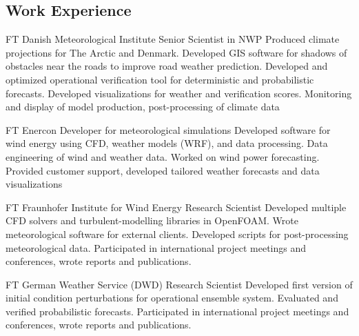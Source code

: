 \documentclass[10pt]{article} %
\begin{document}
\begin{paracol}{2}
\section{Work Experience}





{FT} %
{Danish Meteorological Institute} %
{Senior Scientist in NWP} %
{Produced climate projections for The Arctic and Denmark. Developed GIS software for shadows of obstacles near the roads to improve
road weather prediction. Developed and optimized operational verification tool for deterministic and probabilistic forecasts. Developed
visualizations for weather and verification scores. Monitoring
and display of model production, post-processing of climate data} %


{FT} %
{Enercon} %
{Developer for meteorological simulations} %
{Developed software for wind energy using CFD, weather models (WRF), and data processing. Data engineering
of wind and weather data. Worked on wind power forecasting. Provided customer support, developed
tailored weather forecasts and data visualizations}  %


{FT} %
{Fraunhofer Institute for Wind Energy} %
{Research Scientist} %
{Developed multiple CFD solvers and turbulent-modelling libraries in OpenFOAM. Wrote meteorological software 
for external clients. Developed scripts for post-processing meteorological data. 
Participated in international project meetings and conferences, wrote reports and publications}. %


{FT} %
{German Weather Service (DWD)} %
{Research Scientist} %
{Developed first version of initial condition perturbations for operational ensemble system.
Evaluated and verified probabilistic forecasts.
Participated in international project meetings and conferences, wrote reports and publications.} 


\end{paracol}
\end{document}
